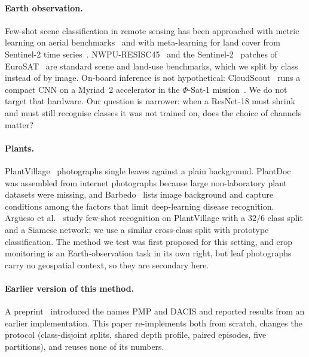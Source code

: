 \paragraph{Earth observation.}
Few-shot scene classification in remote sensing has been approached with metric learning on aerial benchmarks~\cite{li2021rsmetanet} and with meta-learning for land cover from Sentinel-2 time series~\cite{russwurm2020meta}. NWPU-RESISC45~\cite{cheng2017resisc} and the Sentinel-2~\cite{drusch2012sentinel2} patches of EuroSAT~\cite{helber2019eurosat} are standard scene and land-use benchmarks, which we split by class instead of by image. On-board inference is not hypothetical: CloudScout~\cite{giuffrida2020cloudscout} runs a compact CNN on a Myriad~2 accelerator in the $\Phi$-Sat-1 mission~\cite{giuffrida2022phisat}. We do not target that hardware. Our question is narrower: when a ResNet-18 must shrink and must still recognise classes it was not trained on, does the choice of channels matter?

\paragraph{Plants.}
PlantVillage~\cite{hughes2015plantvillage} photographs single leaves against a plain background. PlantDoc~\cite{singh2020plantdoc} was assembled from internet photographs because large non-laboratory plant datasets were missing, and Barbedo~\cite{barbedo2018factors} lists image background and capture conditions among the factors that limit deep-learning disease recognition. Argüeso et al.~\cite{argueso2020fewshot} study few-shot recognition on PlantVillage with a $32/6$ class split and a Siamese network; we use a similar cross-class split with prototype classification. The method we test was first proposed for this setting, and crop monitoring is an Earth-observation task in its own right, but leaf photographs carry no geospatial context, so they are secondary here.

\paragraph{Earlier version of this method.}
A preprint~\cite{uddin2026preprint} introduced the names PMP and DACIS and reported results from an earlier implementation. This paper re-implements both from scratch, changes the protocol (class-disjoint splits, shared depth profile, paired episodes, five partitions), and reuses none of its numbers.
